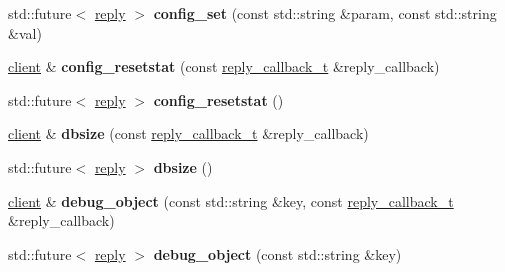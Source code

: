 \begin{DoxyCompactItemize}
\item 
\mbox{\label{classcpp__redis_1_1client_a8fdeb462b43ea6f5199145696713f9b1}} 
std\+::future$<$ \hyperlink{classcpp__redis_1_1reply}{reply} $>$ {\bfseries config\+\_\+set} (const std\+::string \&param, const std\+::string \&val)
\item 
\mbox{\label{classcpp__redis_1_1client_a4b1361aa6c997b76a059c144a302b5be}} 
\hyperlink{classcpp__redis_1_1client}{client} \& {\bfseries config\+\_\+resetstat} (const \hyperlink{classcpp__redis_1_1client_a061a1140d36d2eaeda82b09a0bb3f9f2}{reply\+\_\+callback\+\_\+t} \&reply\+\_\+callback)
\item 
\mbox{\label{classcpp__redis_1_1client_a775508ce5220546e46b573f95d2bcb4d}} 
std\+::future$<$ \hyperlink{classcpp__redis_1_1reply}{reply} $>$ {\bfseries config\+\_\+resetstat} ()
\item 
\mbox{\label{classcpp__redis_1_1client_a87a8351f0a6927db52b4ab2a5b9192c9}} 
\hyperlink{classcpp__redis_1_1client}{client} \& {\bfseries dbsize} (const \hyperlink{classcpp__redis_1_1client_a061a1140d36d2eaeda82b09a0bb3f9f2}{reply\+\_\+callback\+\_\+t} \&reply\+\_\+callback)
\item 
\mbox{\label{classcpp__redis_1_1client_aa9169c3c4a8b3ec5ee7b7bc601ae8a52}} 
std\+::future$<$ \hyperlink{classcpp__redis_1_1reply}{reply} $>$ {\bfseries dbsize} ()
\item 
\mbox{\label{classcpp__redis_1_1client_ad96e4d369e87e858fd7a8296b5cc378e}} 
\hyperlink{classcpp__redis_1_1client}{client} \& {\bfseries debug\+\_\+object} (const std\+::string \&key, const \hyperlink{classcpp__redis_1_1client_a061a1140d36d2eaeda82b09a0bb3f9f2}{reply\+\_\+callback\+\_\+t} \&reply\+\_\+callback)
\item 
\mbox{\label{classcpp__redis_1_1client_a9d7a2eae091f99db6b5479577de0bf99}} 
std\+::future$<$ \hyperlink{classcpp__redis_1_1reply}{reply} $>$ {\bfseries debug\+\_\+object} (const std\+::string \&key)
\item 
\mbox{\label{classcpp__redis_1_1client_ac5d06ca1072ef1a83a8843c448e4d1e3}} 

\end{DoxyCompactItemize}
